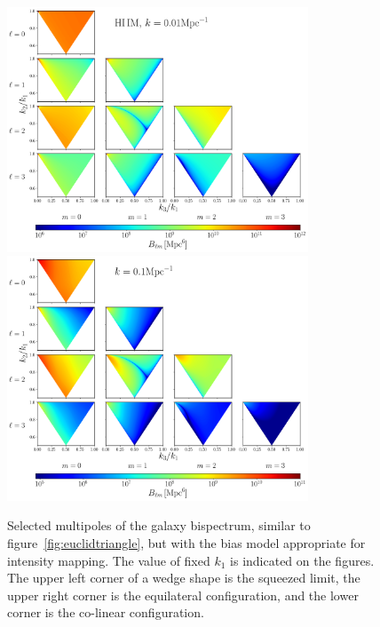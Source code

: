 {\clearpage
\begin{figure}[ht]
	\centering
	\includegraphics[width=0.8\textwidth]{fig/triangles_all_k001_IM.png}
	\includegraphics[width=0.8\textwidth]{fig/triangles_all_k01_IM.png} 
	\caption{Selected multipoles of the galaxy bispectrum, similar to figure~\ref{fig:euclidtriangle}, but with the bias model appropriate for intensity mapping. The value of fixed \(k_1\) is indicated on the figures. The upper left corner of a wedge shape is the squeezed limit, the upper right corner is the equilateral configuration, and the lower corner is the co-linear configuration. \label{fig:imtriangle}}
\end{figure}

}
